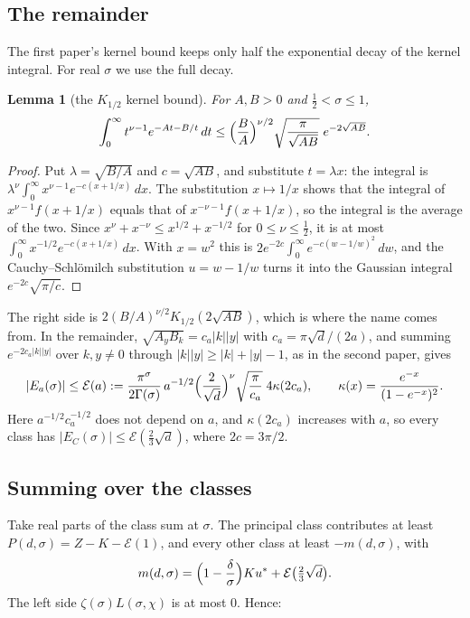\documentclass[11pt]{article}
\newtheorem{lemma}[theorem]{Lemma}
\theoremstyle{definition}
\begin{document}
\subsection{The remainder}

The first paper's kernel bound keeps only half the exponential decay of the kernel integral. For real $\sigma$ we use the full decay.

\begin{lemma}[the $K_{1/2}$ kernel bound]\label{lem:khalf}
For $A, B > 0$ and $\frac12 < \sigma \le 1$,
\[
\int_0^\infty t^{\nu - 1}e^{-At - B/t}\,dt \le \Bigl(\frac BA\Bigr)^{\nu/2}\sqrt{\frac{\pi}{\sqrt{AB}}}\;e^{-2\sqrt{AB}} .
\]
\end{lemma}

\begin{proof}
Put $\lambda = \sqrt{B/A}$ and $c = \sqrt{AB}$, and substitute $t = \lambda x$: the integral is $\lambda^\nu\int_0^\infty x^{\nu-1}e^{-c(x + 1/x)}\,dx$. The substitution $x \mapsto 1/x$ shows that the integral of $x^{\nu-1}f(x + 1/x)$ equals that of $x^{-\nu-1}f(x+1/x)$, so the integral is the average of the two. Since $x^\nu + x^{-\nu} \le x^{1/2} + x^{-1/2}$ for $0 \le \nu \le \frac12$, it is at most $\int_0^\infty x^{-1/2}e^{-c(x+1/x)}\,dx$. With $x = w^2$ this is $2e^{-2c}\int_0^\infty e^{-c(w - 1/w)^2}\,dw$, and the Cauchy--Schl\"omilch substitution $u = w - 1/w$ turns it into the Gaussian integral $e^{-2c}\sqrt{\pi/c}$.
\end{proof}

The right side is $2(B/A)^{\nu/2}K_{1/2}(2\sqrt{AB})$, which is where the name comes from. In the remainder, $\sqrt{A_yB_k} = c_a|k||y|$ with $c_a = \pi\sqrt d/(2a)$, and summing $e^{-2c_a|k||y|}$ over $k, y \ne 0$ through $|k||y| \ge |k| + |y| - 1$, as in the second paper, gives
\[
|E_a(\sigma)| \le \mathcal E(a) := \frac{\pi^\sigma}{2\Gamma(\sigma)}\,a^{-1/2}\Bigl(\frac{2}{\sqrt d}\Bigr)^{\nu}\sqrt{\frac{\pi}{c_a}}\;4\kappa(2c_a), \qquad \kappa(x) = \frac{e^{-x}}{(1-e^{-x})^2}.
\]
Here $a^{-1/2}c_a^{-1/2}$ does not depend on $a$, and $\kappa(2c_a)$ increases with $a$, so every class has $|E_C(\sigma)| \le \mathcal E(\frac23\sqrt d)$, where $2c = 3\pi/2$.

\subsection{Summing over the classes}

Take real parts of the class sum at $\sigma$. The principal class contributes at least $P(d,\sigma) = Z - K - \mathcal E(1)$, and every other class at least $-m(d,\sigma)$, with
\[
m(d,\sigma) = \Bigl(1 - \frac\delta\sigma\Bigr)Ku^* + \mathcal E\bigl(\tfrac23\sqrt d\bigr).
\]
The left side $\zeta(\sigma)L(\sigma,\chi)$ is at most $0$. Hence:
\end{document}
